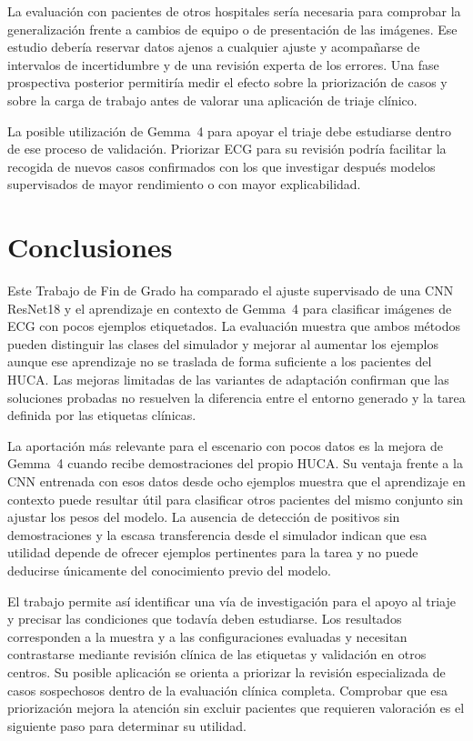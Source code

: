 La evaluación con pacientes de otros hospitales sería necesaria para comprobar la generalización frente a cambios de equipo o de presentación de las imágenes. Ese estudio debería reservar datos ajenos a cualquier ajuste y acompañarse de intervalos de incertidumbre y de una revisión experta de los errores. Una fase prospectiva posterior permitiría medir el efecto sobre la priorización de casos y sobre la carga de trabajo antes de valorar una aplicación de triaje clínico.

La posible utilización de Gemma~4 para apoyar el triaje debe estudiarse dentro de ese proceso de validación. Priorizar ECG para su revisión podría facilitar la recogida de nuevos casos confirmados con los que investigar después modelos supervisados de mayor rendimiento o con mayor explicabilidad.

\section{Conclusiones}

\begingroup
{}
Este Trabajo de Fin de Grado ha comparado el ajuste supervisado de una CNN ResNet18 y el aprendizaje en contexto de Gemma~4 para clasificar imágenes de ECG con pocos ejemplos etiquetados. La evaluación muestra que ambos métodos pueden distinguir las clases del simulador y mejorar al aumentar los ejemplos aunque ese aprendizaje no se traslada de forma suficiente a los pacientes del HUCA. Las mejoras limitadas de las variantes de adaptación confirman que las soluciones probadas no resuelven la diferencia entre el entorno generado y la tarea definida por las etiquetas clínicas.
\par
\endgroup

La aportación más relevante para el escenario con pocos datos es la mejora de Gemma~4 cuando recibe demostraciones del propio HUCA. Su ventaja frente a la CNN entrenada con esos datos desde ocho ejemplos muestra que el aprendizaje en contexto puede resultar útil para clasificar otros pacientes del mismo conjunto sin ajustar los pesos del modelo. La ausencia de detección de positivos sin demostraciones y la escasa transferencia desde el simulador indican que esa utilidad depende de ofrecer ejemplos pertinentes para la tarea y no puede deducirse únicamente del conocimiento previo del modelo.

El trabajo permite así identificar una vía de investigación para el apoyo al triaje y precisar las condiciones que todavía deben estudiarse. Los resultados corresponden a la muestra y a las configuraciones evaluadas y necesitan contrastarse mediante revisión clínica de las etiquetas y validación en otros centros. Su posible aplicación se orienta a priorizar la revisión especializada de casos sospechosos dentro de la evaluación clínica completa. Comprobar que esa priorización mejora la atención sin excluir pacientes que requieren valoración es el siguiente paso para determinar su utilidad.
